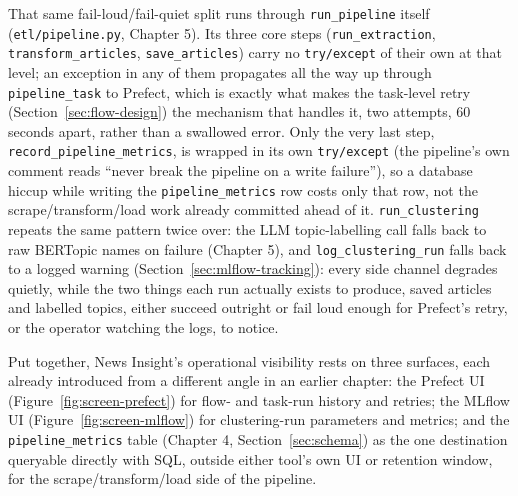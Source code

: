 \begin{sloppypar}
That same fail-loud/fail-quiet split runs through \texttt{run\_pipeline} itself (\texttt{etl/\allowbreak pipeline.py}, Chapter 5). Its three core steps (\texttt{run\_extraction}, \texttt{transform\_articles}, \texttt{save\_articles}) carry no \texttt{try/except} of their own at that level; an exception in any of them propagates all the way up through \texttt{pipeline\_task} to Prefect, which is exactly what makes the task-level retry (Section~\ref{sec:flow-design}) the mechanism that handles it, two attempts, 60 seconds apart, rather than a swallowed error. Only the very last step, \texttt{record\_pipeline\_metrics}, is wrapped in its own \texttt{try/except} (the pipeline's own comment reads ``never break the pipeline on a write failure''), so a database hiccup while writing the \texttt{pipeline\_metrics} row costs only that row, not the scrape/transform/load work already committed ahead of it. \texttt{run\_clustering} repeats the same pattern twice over: the LLM topic-labelling call falls back to raw BERTopic names on failure (Chapter 5), and \texttt{log\_clustering\_run} falls back to a logged warning (Section~\ref{sec:mlflow-tracking}): every side channel degrades quietly, while the two things each run actually exists to produce, saved articles and labelled topics, either succeed outright or fail loud enough for Prefect's retry, or the operator watching the logs, to notice.
\end{sloppypar}

\begin{sloppypar}
Put together, News Insight's operational visibility rests on three surfaces, each already introduced from a different angle in an earlier chapter: the Prefect UI (Figure~\ref{fig:screen-prefect}) for flow- and task-run history and retries; the MLflow UI (Figure~\ref{fig:screen-mlflow}) for clustering-run parameters and metrics; and the \texttt{pipeline\_metrics} table (Chapter 4, Section~\ref{sec:schema}) as the one destination queryable directly with SQL, outside either tool's own UI or retention window, for the scrape/transform/load side of the pipeline.
\end{sloppypar}

